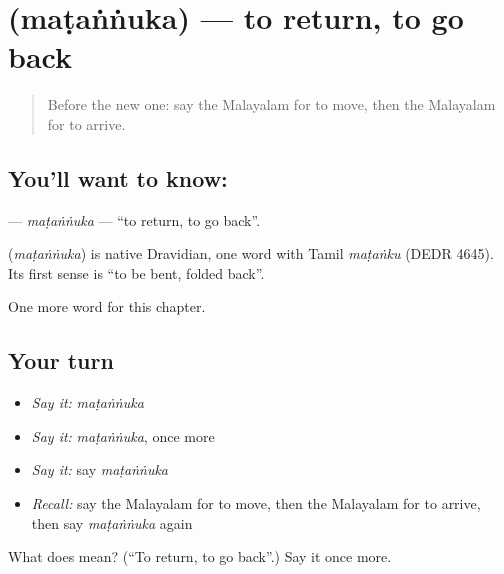 \section[\texorpdfstring{\ml{മടങ്ങുക} (maṭaṅṅuka)}{മടങ്ങുക (maṭaṅṅuka)}]{ (maṭaṅṅuka) — to return, to go back}

\label{lesson:ML-C225-matannuka}



\begin{quote}
Before the new one: say the Malayalam for to move, then the Malayalam for to arrive.
\end{quote}

\subsection*{You'll want to know: }
\textbf{} — \emph{maṭaṅṅuka} — \textquotedblleft{}to return, to go back\textquotedblright{}.

\begin{cousinweb}
\textbf{} (\emph{maṭaṅṅuka}) is native Dravidian, one word with Tamil \emph{maṭaṅku} (DEDR 4645). Its first sense is \textquotedblleft{}to be bent, folded back\textquotedblright{}.
\end{cousinweb}

\begin{grammarlens}[title={What you've built}]
One more word for this chapter.
\end{grammarlens}

\subsection*{Your turn}
\begin{itemize}
\raggedright
  \item \emph{Say it:} \emph{maṭaṅṅuka}
  \item \emph{Say it:} \emph{maṭaṅṅuka}, once more
  \item \emph{Say it:} say \emph{maṭaṅṅuka}
  \item \emph{Recall:} say the Malayalam for to move, then the Malayalam for to arrive, then say \emph{maṭaṅṅuka} again
\end{itemize}

\begin{tcolorbox}[breakable,colback=teal!4,colframe=teal!35!black,title={Before you move on}]
What does  mean? (\textquotedblleft{}To return, to go back\textquotedblright{}.) Say it once more.
\end{tcolorbox}
